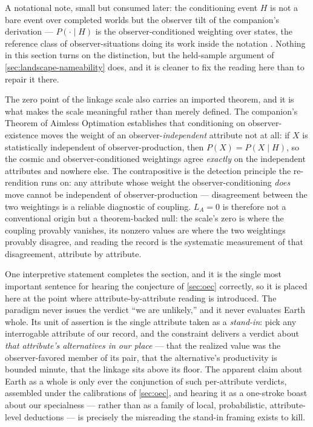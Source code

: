 \documentclass[11pt]{article}
\theoremstyle{definition}
\begin{document}
A notational note, small but consumed later: the conditioning event $H$ is not a bare event over completed worlds but the observer tilt of the companion's derivation --- $P(\cdot \mid H)$ is the observer-conditioned weighting over states, the reference class of observer-situations doing its work inside the notation \cite{NexicFoundation, Nexus}. Nothing in this section turns on the distinction, but the held-sample argument of \autoref{sec:landscape-nameability} does, and it is cleaner to fix the reading here than to repair it there.

The zero point of the linkage scale also carries an imported theorem, and it is what makes the scale meaningful rather than merely defined. The companion's Theorem of Aimless Optimation \cite{Nexus} establishes that conditioning on observer-existence moves the weight of an observer-\emph{independent} attribute not at all: if $X$ is statistically independent of observer-production, then $P(X) = P(X \mid H)$, so the cosmic and observer-conditioned weightings agree \emph{exactly} on the independent attributes and nowhere else. The contrapositive is the detection principle the re-rendition runs on: any attribute whose weight the observer-conditioning \emph{does} move cannot be independent of observer-production --- disagreement between the two weightings is a reliable diagnostic of coupling. $L_A = 0$ is therefore not a conventional origin but a theorem-backed null: the scale's zero is where the coupling provably vanishes, its nonzero values are where the two weightings provably disagree, and reading the record is the systematic measurement of that disagreement, attribute by attribute.

One interpretive statement completes the section, and it is the single most important sentence for hearing the conjecture of \autoref{sec:oec} correctly, so it is placed here at the point where attribute-by-attribute reading is introduced. The paradigm never issues the verdict ``we are unlikely,'' and it never evaluates Earth whole. Its unit of assertion is the single attribute taken as a \emph{stand-in}: pick any interrogable attribute of our record, and the constraint delivers a verdict about \emph{that attribute's alternatives in our place} --- that the realized value was the observer-favored member of its pair, that the alternative's productivity is bounded minute, that the linkage sits above its floor. The apparent claim about Earth as a whole is only ever the conjunction of such per-attribute verdicts, assembled under the calibrations of \autoref{sec:oec}, and hearing it as a one-stroke boast about our specialness --- rather than as a family of local, probabilistic, attribute-level deductions --- is precisely the misreading the stand-in framing exists to kill.
\end{document}
